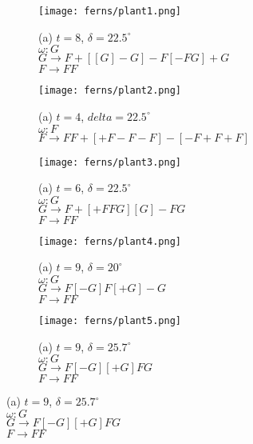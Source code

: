 \begin{figure}[tbh]
\begin{center}
	\begin{subfigure}[tbh]{0.3\textwidth}
	\begin{center}
	\texttt{[image: ferns/plant1.png]}
    \caption{(a) $t = 8$, $\delta = 22.5 ^{\circ}$ \\ $\omega: G$ \\ $G \rightarrow F+[[G]-G]-F[-FG]+G$ \\ $F \rightarrow FF$}
	\end{center}
	\end{subfigure}
\hfill
	\begin{subfigure}[tbh]{0.3\textwidth}
	\begin{center}
	\texttt{[image: ferns/plant2.png]}
	\caption{(a) $t = 4$, $delta = 22.5^{\circ}$ \\ $\omega: F$ \\ $F \rightarrow FF+[+F-F-F]-[-F+F+F]$}
	\end{center}
	\end{subfigure}
\hfill
	\begin{subfigure}[tbh]{0.3\textwidth}
	\begin{center}
	\texttt{[image: ferns/plant3.png]}
	\caption{(a) $t = 6$, $\delta = 22.5^{\circ}$ \\ $\omega: G$ \\ $G\rightarrow F+[+FFG][G]-FG$ \\ $F \rightarrow FF$}
	\end{center}
	\end{subfigure}
\hfill
	\begin{subfigure}[tbh]{0.3\textwidth}
	\begin{center}
	\texttt{[image: ferns/plant4.png]}
	\caption{(a) $t = 9$, $\delta = 20^{\circ}$ \\ $\omega: G$ \\ $G\rightarrow F[-G]F[+G]-G$ \\ $F \rightarrow FF$}
	\end{center}
	\end{subfigure}
\hfill
	\begin{subfigure}[tbh]{0.3\textwidth}
	\begin{center}
	\texttt{[image: ferns/plant5.png]}
	\caption{(a) $t = 9$, $\delta = 25.7^{\circ}$ \\ $\omega: G$ \\ $G\rightarrow F[-G][+G]FG $\\ $F \rightarrow FF$}

\end{center}
\end{subfigure}
\end{center}
\end{figure}
